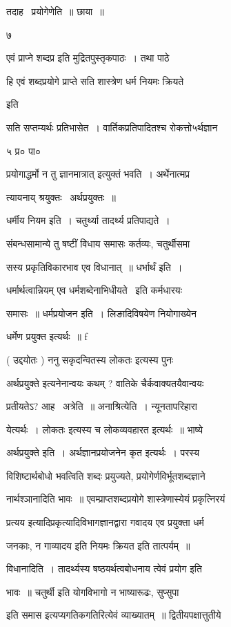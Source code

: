 \documentclass[11pt, openany]{book}
\begin{document}
तदाह \textendash\ प्रयोगेणेति~॥ छाया~॥ 

७ {\qt एवं प्राप्ने शब्दप्र इति मुद्रितपुस्तृकपाठः~। तथा पाठे 

हि एवं शब्दप्रयोगे प्राप्ते सति शास्त्रेण धर्म नियमः क्रियते} इति 

सति सप्तम्यर्थः प्रतिभासेत~। वार्तिकप्रतिपादितश्च रोकत्तो५र्थज्ञान \textendash\ 

५ प्र० पा० 



{\qt प्रयोगाद्धर्मो न तु ज्ञानमात्रात्} इत्युक्तं भवति~। अर्थेनात्मप्र \textendash\ 

त्यायनाय् श्रयुक्तः \textendash\ अर्थप्रयुक्तः~॥ 

धर्मीय नियम इति~। चतुर्थ्या तादर्थ्य प्रतिपाद्यते~। 

संबन्धसामान्ये तु षष्टीं विधाय समासः कर्तव्यः, चतुर्थीसमा \textendash\ 

सस्य प्रकृतिविकारभाव एव विधानात्~॥ धर्भार्थं इति~। 

धर्मार्थत्वान्नियम् एव धर्मशब्देनाभिधीयते \textendash\ इति कर्मधारयः 

समासः~॥ धर्मप्रयोजन इति~। लिङादिविषयेण नियोगाख्येन 

धर्मेण प्रयुक्त इत्यर्थः~॥ f 

( उद्दयोतः ) ननु सकृदन्वितस्य {\qt लोकतः} इत्यस्य पुनः 

{\qt अर्थप्रयुक्ते} इत्यनेनान्वयः कथम् ? वातिके चैर्कवाक्यतयैवान्वयः 

प्रतीयतेऽ? आह \textendash\ अत्रेति~॥ अनाश्रित्येति~। न्यूनतापरिहारा \textendash\ 

येत्यर्थः~। {\qt लोकतः} इत्यस्य च लोकव्यवहारत इत्यर्थः~॥ भाष्ये \textendash\ 

अर्थप्रयुक्ते इति~। अर्थज्ञानप्रयोजनेन कृत इत्यर्थः~। परस्य 

विशिष्टार्थबोधो भवत्विति शब्दः प्रयुज्यते, प्रयोगेर्णविर्भूतशब्दज्ञाने \textendash\ 


नार्थश्ञानादिति भावः~॥ एवम्प्राप्तशब्दप्रयोगे शास्त्रेणास्येयं
प्रकृत्निरयं 

प्रत्यय इत्यादिप्रकृत्यादिविभागज्ञानद्वारा गवादय एव प्रयुक्ता धर्म \textendash\ 

जनकाः, न गाव्यादय इति नियमः क्रियत इति तात्पर्यम्~॥ 

विधानादिति~। तादर्थ्यस्य षष्ठयर्थत्वबोधनाय {\qt त्वेवं} प्रयोग इति 

भावः~॥ {\qt चतुर्थी} इति योगविभागो न भाष्यारूढः, {\qt सुप्सुपा} 

इति समास इत्यप्यगतिकगतिरित्येवं व्याख्यातम्~॥ द्वितीयपक्षात्तुतीये 
\end{document}
